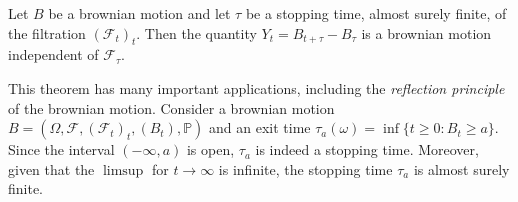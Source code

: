 \begin{theorem}
    Let $B$ be a brownian motion and let $\tau$ be a stopping time, almost surely finite, of the filtration $(\mathcal{F}_t)_t$. Then the quantity $Y_t = B_{t+\tau}-B_{\tau}$ is a brownian motion independent of $\mathcal{F}_{\tau}$. 
\end{theorem}

This theorem has many important applications, including the \textit{reflection principle} of the brownian motion. Consider a brownian motion $B = (\Omega, \mathcal{F}, (\mathcal{F}_t)_t, (B_t), \mathbb{P})$ and an exit time $\tau_a(\omega) = \inf \{ t \geq 0 : B_t \geq a \}$. Since the interval $(-\infty,a)$ is open,  $\tau_a$ is indeed a stopping time. Moreover, given that the $\limsup$ for $t \to \infty$ is infinite, the stopping time $\tau_a$ is almost surely finite. 

